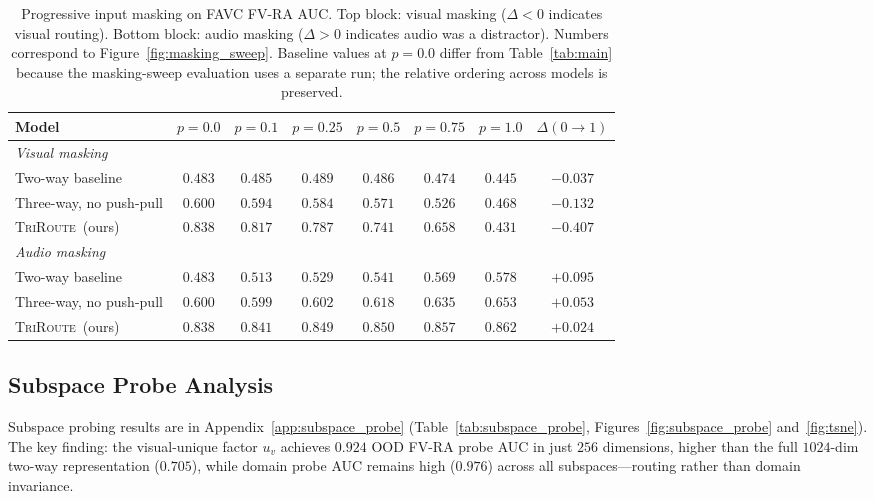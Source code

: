 \documentclass{article}
\newcommand{\method}{\textsc{TriRoute}}
\begin{document}
\begin{table}[t]
    \centering
    \caption{Progressive input masking on FAVC FV-RA AUC. Top block: visual masking ($\Delta < 0$ indicates visual routing). Bottom block: audio masking ($\Delta > 0$ indicates audio was a distractor). Numbers correspond to Figure~\ref{fig:masking_sweep}. Baseline values at $p{=}0.0$ differ from Table~\ref{tab:main} because the masking-sweep evaluation uses a separate run; the relative ordering across models is preserved.}
    \label{tab:masking_sweep}
    \small
    \begin{tabular}{lccccccc}
        \toprule
        Model & $p{=}0.0$ & $p{=}0.1$ & $p{=}0.25$ & $p{=}0.5$ & $p{=}0.75$ & $p{=}1.0$ & $\Delta(0{\rightarrow}1)$ \\
        \midrule
        \multicolumn{8}{l}{\emph{Visual masking}} \\
        Two-way baseline        & $0.483$ & $0.485$ & $0.489$ & $0.486$ & $0.474$ & $0.445$ & $-0.037$ \\
        Three-way, no push-pull & $0.600$ & $0.594$ & $0.584$ & $0.571$ & $0.526$ & $0.468$ & $-0.132$ \\
        \method\ (ours)         & $0.838$ & $0.817$ & $0.787$ & $0.741$ & $0.658$ & $0.431$ & $\mathbf{-0.407}$ \\
        \midrule
        \multicolumn{8}{l}{\emph{Audio masking}} \\
        Two-way baseline        & $0.483$ & $0.513$ & $0.529$ & $0.541$ & $0.569$ & $0.578$ & $\mathbf{+0.095}$ \\
        Three-way, no push-pull & $0.600$ & $0.599$ & $0.602$ & $0.618$ & $0.635$ & $0.653$ & $+0.053$ \\
        \method\ (ours)         & $0.838$ & $0.841$ & $0.849$ & $0.850$ & $0.857$ & $0.862$ & $+0.024$ \\
        \bottomrule
    \end{tabular}
\end{table}

\subsection{Subspace Probe Analysis}
\label{sec:subspace_probe}

Subspace probing results are in Appendix~\ref{app:subspace_probe} (Table~\ref{tab:subspace_probe}, Figures~\ref{fig:subspace_probe} and~\ref{fig:tsne}). The key finding: the visual-unique factor $u_v$ achieves $0.924$ OOD FV-RA probe AUC in just $256$ dimensions, higher than the full $1024$-dim two-way representation ($0.705$), while domain probe AUC remains high ($0.976$) across all subspaces---routing rather than domain invariance.
\end{document}

